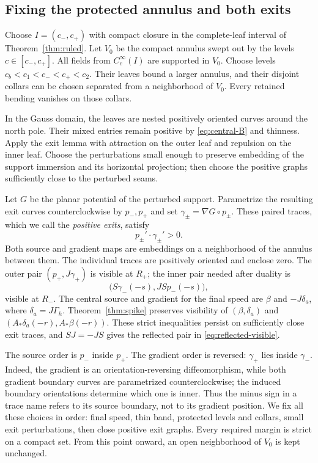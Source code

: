 \documentclass[11pt]{amsart}
\theoremstyle{definition}
\theoremstyle{remark}
\numberwithin{equation}{section}
\begin{document}
\subsection{Fixing the protected annulus and both exits}
Choose $I=(c_-,c_+)$ with compact closure in the complete-leaf interval
of Theorem~\ref{thm:ruled}. Let $V_0$ be the compact annulus swept out
by the levels $c\in[c_-,c_+]$. All fields from $C_c^\infty(I)$ are
supported in $V_0$. Choose levels
$c_b<c_1<c_-<c_+<c_2$. Their leaves bound a larger annulus, and their
disjoint collars can be chosen separated from a neighborhood of $V_0$.
Every retained bending vanishes on those collars.

In the Gauss domain, the leaves are nested positively oriented curves
around the north pole. Their mixed entries remain positive by
\eqref{eq:central-B} and thinness. Apply the exit lemma with attraction
on the outer leaf and repulsion on the inner leaf. Choose the perturbations
small enough to preserve embedding of the support immersion and its
horizontal projection; then choose the positive graphs sufficiently close
to the perturbed seams.

Let $G$ be the planar potential of the perturbed support. Parametrize
the resulting exit curves counterclockwise by $p_-,p_+$ and set
$\gamma_\pm=\nabla G\circ p_\pm$. These paired traces, which we call
the \emph{positive exits}, satisfy
\begin{equation}\label{eq:positive-traces}
 p_\pm'\cdot\gamma_\pm'>0.
\end{equation}
Both source and gradient maps are embeddings on a neighborhood of the
annulus between them. The individual traces are positively oriented and
enclose zero. The outer pair $(p_+,J\gamma_+)$ is visible at $R_+$;
the inner pair needed after duality is
\begin{equation}\label{eq:reflected-visible}
 \bigl(S\gamma_-(-s),JS p_-(-s)\bigr),
\end{equation}
visible at $R_-$. The central source and gradient for the final speed
are $\beta$ and $-J\delta_a$, where $\delta_a=J\Gamma_h$.
Theorem~\ref{thm:spike} preserves visibility of $(\beta,\delta_a)$ and
$(A_*\delta_a(-r),A_*\beta(-r))$. These strict inequalities persist
on sufficiently close exit traces, and $SJ=-JS$ gives the reflected
pair in \eqref{eq:reflected-visible}.

The source order is $p_-$ inside $p_+$. The gradient order is reversed:
$\gamma_+$ lies inside $\gamma_-$. Indeed, the gradient is an
orientation-reversing diffeomorphism, while both gradient boundary
curves are parametrized counterclockwise; the induced boundary
orientations determine which one is inner. Thus the minus sign in a
trace name refers to its source boundary, not to its gradient position. We fix all these choices in order: final speed, thin
band, protected levels and collars, small exit perturbations, then close
positive exit graphs. Every required margin is strict on a compact set.
From this point onward, an open neighborhood of $V_0$ is kept unchanged.
\end{document}
